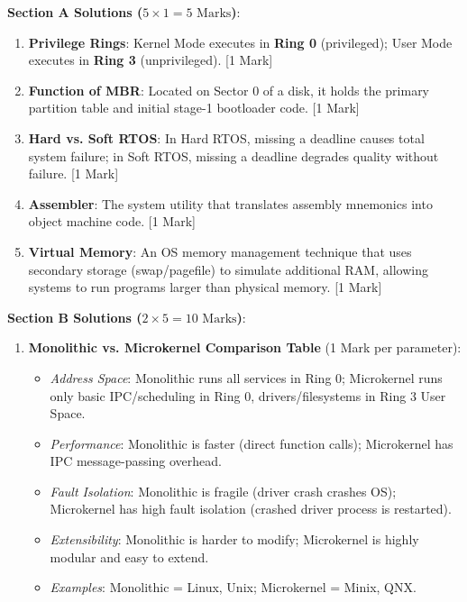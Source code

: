 \begin{solutionbox}
\noindent\textbf{Section A Solutions ($5 \times 1 = 5\text{ Marks}$)}:
\begin{enumerate}
    \item \textbf{Privilege Rings}: Kernel Mode executes in \textbf{Ring 0} (privileged); User Mode executes in \textbf{Ring 3} (unprivileged). [1 Mark]
    \item \textbf{Function of MBR}: Located on Sector 0 of a disk, it holds the primary partition table and initial stage-1 bootloader code. [1 Mark]
    \item \textbf{Hard vs. Soft RTOS}: In Hard RTOS, missing a deadline causes total system failure; in Soft RTOS, missing a deadline degrades quality without failure. [1 Mark]
    \item \textbf{Assembler}: The system utility that translates assembly mnemonics into object machine code. [1 Mark]
    \item \textbf{Virtual Memory}: An OS memory management technique that uses secondary storage (swap/pagefile) to simulate additional RAM, allowing systems to run programs larger than physical memory. [1 Mark]
\end{enumerate}

\medskip
\noindent\textbf{Section B Solutions ($2 \times 5 = 10\text{ Marks}$)}:
\begin{enumerate}[start=6]
    \item \textbf{Monolithic vs. Microkernel Comparison Table} (1 Mark per parameter):
    \begin{itemize}
        \item \textit{Address Space}: Monolithic runs all services in Ring 0; Microkernel runs only basic IPC/scheduling in Ring 0, drivers/filesystems in Ring 3 User Space.
        \item \textit{Performance}: Monolithic is faster (direct function calls); Microkernel has IPC message-passing overhead.
        \item \textit{Fault Isolation}: Monolithic is fragile (driver crash crashes OS); Microkernel has high fault isolation (crashed driver process is restarted).
        \item \textit{Extensibility}: Monolithic is harder to modify; Microkernel is highly modular and easy to extend.
        \item \textit{Examples}: Monolithic = Linux, Unix; Microkernel = Minix, QNX.
    \end{itemize}


\end{enumerate}
\end{solutionbox}
